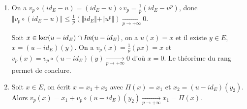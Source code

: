 \begin{solution}
	\phantom{}
	\begin{enumerate}
		\item On a $v_{p}\circ(id_{E}-u)=(id_{E}-u)\circ v_{p}=\frac{1}{p}(id_{E}-u^{p})$, donc $\Vert v_{p}\circ(id_{E}-u)\Vert\leqslant\frac{1}{p}(\Vert id_{E}\Vert+\Vert u^{p}\Vert)\xrightarrow[p\to+\infty]{}0$.
		
		Soit $x\in\ker(u-id_{E})\cap\emph{Im}(u-id_{E})$, on a $u(x)=x$ et il existe $y\in E$, $x=(u-id_{E})(y)$. On a $v_{p}(x)=\frac{1}{p}(px)=x$ et $v_{p}(x)=v_{p}\circ(u-id_{E})(y)\xrightarrow[p\to+\infty]{}0$ d'où $x=0$. Le théorème du rang permet de conclure.

		\item Soit $x\in E$, on écrit $x=x_{1}+x_{2}$ avec $\Pi(x)=x_{1}$ et $x_{2}=(u-id_{E})(y_{2})$. Alors $v_{p}(x)=x_{1}+v_{p}\circ(u-id_{E})(y_{2})\xrightarrow[p\to+\infty]{}x_{1}=\Pi(x)$.
	\end{enumerate}
\end{solution}

